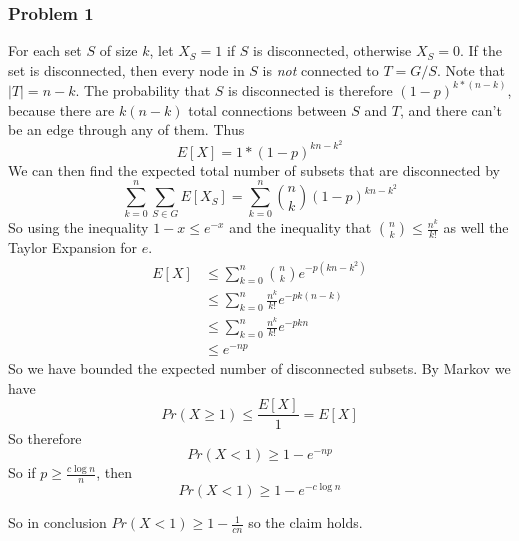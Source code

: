 \documentclass[12pt,letterpaper]{article}
\newenvironment{answer}[1]{
  \subsubsection*{Problem #1}
}{\newpage}
\begin{document}
\begin{answer}{1}
For each set $S$ of size $k$, let $X_S = 1$ if $S$ is disconnected, otherwise $X_S = 0$. If the set is disconnected, then every node in $S$ is \emph{not} connected to $T = G / S$. Note that $|T| = n - k$. The probability that $S$ is disconnected is therefore $(1-p)^{k*(n - k)}$, because there are $k (n - k)$ total connections between $S$ and $T$, and there can't be an edge through any of them. Thus
	$$ E[X] = 1 * (1 - p)^{kn - k^2} $$
We can then find the expected total number of subsets that are disconnected by
	$$ \sum_{k=0}^n \sum_{S \in G} E[X_S] = \sum_{k=0}^n {n \choose k} (1 - p)^{kn - k^2}$$
So using the inequality $1 - x \le e^{-x}$ and the inequality that ${n \choose k} \le \frac{n^k}{k!}$ as well the Taylor Expansion for $e$.
\begin{align*}
E[X] &\le \sum_{k=0}^n {n \choose k} e^{-p(kn - k^2)}\\
	&\le \sum_{k=0}^n \frac{n^k}{k!}e^{-pk(n-k)}\\
	&\le \sum_{k=0}^n \frac{n^k}{k!}e^{-pkn} \\
	&\le e^{-np}
\end{align*}
So we have bounded the expected number of disconnected subsets. By Markov we have
$$ Pr(X \ge 1) \le \frac{E[X]}{1} = E[X] $$
So therefore
$$ Pr(X < 1) \ge 1 - e^{-np} $$
So if $p \ge \frac{c \log{n}}{n}$, then
$$ Pr(X < 1) \ge 1 - e^{-c\log{n}}$$

So in conclusion $Pr(X < 1) \ge 1 - \frac{1}{cn}$ so the claim holds.
\end{answer}
\end{document}
